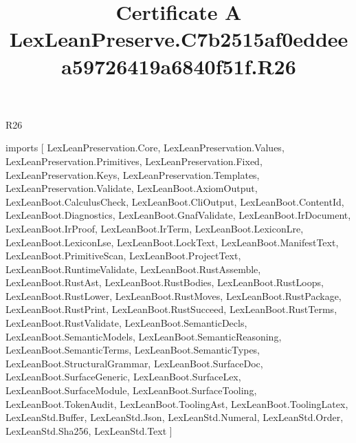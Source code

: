 \begin{lexlean}{R26}
\title{Certificate A LexLeanPreserve.C7b2515af0eddeea59726419a6840f51f.R26}
\begin{coremodule}
imports [
  LexLeanPreservation.Core,
  LexLeanPreservation.Values,
  LexLeanPreservation.Primitives,
  LexLeanPreservation.Fixed,
  LexLeanPreservation.Keys,
  LexLeanPreservation.Templates,
  LexLeanPreservation.Validate,
  LexLeanBoot.AxiomOutput,
  LexLeanBoot.CalculusCheck,
  LexLeanBoot.CliOutput,
  LexLeanBoot.ContentId,
  LexLeanBoot.Diagnostics,
  LexLeanBoot.GnafValidate,
  LexLeanBoot.IrDocument,
  LexLeanBoot.IrProof,
  LexLeanBoot.IrTerm,
  LexLeanBoot.LexiconLre,
  LexLeanBoot.LexiconLse,
  LexLeanBoot.LockText,
  LexLeanBoot.ManifestText,
  LexLeanBoot.PrimitiveScan,
  LexLeanBoot.ProjectText,
  LexLeanBoot.RuntimeValidate,
  LexLeanBoot.RustAssemble,
  LexLeanBoot.RustAst,
  LexLeanBoot.RustBodies,
  LexLeanBoot.RustLoops,
  LexLeanBoot.RustLower,
  LexLeanBoot.RustMoves,
  LexLeanBoot.RustPackage,
  LexLeanBoot.RustPrint,
  LexLeanBoot.RustSucceed,
  LexLeanBoot.RustTerms,
  LexLeanBoot.RustValidate,
  LexLeanBoot.SemanticDecls,
  LexLeanBoot.SemanticModels,
  LexLeanBoot.SemanticReasoning,
  LexLeanBoot.SemanticTerms,
  LexLeanBoot.SemanticTypes,
  LexLeanBoot.StructuralGrammar,
  LexLeanBoot.SurfaceDoc,
  LexLeanBoot.SurfaceGeneric,
  LexLeanBoot.SurfaceLex,
  LexLeanBoot.SurfaceModule,
  LexLeanBoot.SurfaceTooling,
  LexLeanBoot.TokenAudit,
  LexLeanBoot.ToolingAst,
  LexLeanBoot.ToolingLatex,
  LexLeanStd.Buffer,
  LexLeanStd.Json,
  LexLeanStd.Numeral,
  LexLeanStd.Order,
  LexLeanStd.Sha256,
  LexLeanStd.Text
]


\end{coremodule}
\end{lexlean}
